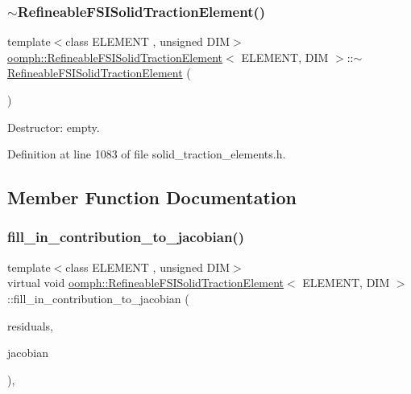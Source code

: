 \subsubsection{\texorpdfstring{$\sim$\+Refineable\+F\+S\+I\+Solid\+Traction\+Element()}{~RefineableFSISolidTractionElement()}}
{\footnotesize\ttfamily template$<$class E\+L\+E\+M\+E\+NT , unsigned D\+IM$>$ \\
\hyperlink{classoomph_1_1RefineableFSISolidTractionElement}{oomph\+::\+Refineable\+F\+S\+I\+Solid\+Traction\+Element}$<$ E\+L\+E\+M\+E\+NT, D\+IM $>$\+::$\sim$\hyperlink{classoomph_1_1RefineableFSISolidTractionElement}{Refineable\+F\+S\+I\+Solid\+Traction\+Element} (\begin{DoxyParamCaption}{ }\end{DoxyParamCaption})\hspace{0.3cm}{\ttfamily [inline]}}



Destructor\+: empty. 



Definition at line 1083 of file solid\+\_\+traction\+\_\+elements.\+h.



\subsection{Member Function Documentation}
\mbox{\label{classoomph_1_1RefineableFSISolidTractionElement_a886a6bcb5722c9535f6f78ccefdc0646}} 
\subsubsection{\texorpdfstring{fill\+\_\+in\+\_\+contribution\+\_\+to\+\_\+jacobian()}{fill\_in\_contribution\_to\_jacobian()}}
{\footnotesize\ttfamily template$<$class E\+L\+E\+M\+E\+NT , unsigned D\+IM$>$ \\
virtual void \hyperlink{classoomph_1_1RefineableFSISolidTractionElement}{oomph\+::\+Refineable\+F\+S\+I\+Solid\+Traction\+Element}$<$ E\+L\+E\+M\+E\+NT, D\+IM $>$\+::fill\+\_\+in\+\_\+contribution\+\_\+to\+\_\+jacobian (\begin{DoxyParamCaption}\item[{\hyperlink{classoomph_1_1Vector}{Vector}$<$ double $>$ \&}]{residuals,  }\item[{\hyperlink{classoomph_1_1DenseMatrix}{Dense\+Matrix}$<$ double $>$ \&}]{jacobian }\end{DoxyParamCaption})\hspace{0.3cm}{\ttfamily [inline]}, {\ttfamily [virtual]}}



